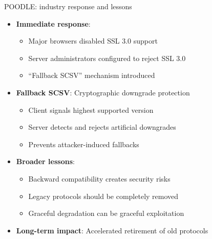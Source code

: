 \ifdefined\PRESENTATION\else\PassOptionsToClass{handout}{beamer}\fi\documentclass[aspectratio=169, lualatex]{beamer}
\begin{document}
\begin{frame}{POODLE: industry response and lessons}
	\begin{itemize}
		\item \textbf{Immediate response}:
		      \begin{itemize}
			      \item Major browsers disabled SSL 3.0 support
			      \item Server administrators configured to reject SSL 3.0
			      \item ``Fallback SCSV'' mechanism introduced
		      \end{itemize}
		\item \textbf{Fallback SCSV}: Cryptographic downgrade protection
		      \begin{itemize}
			      \item Client signals highest supported version
			      \item Server detects and rejects artificial downgrades
			      \item Prevents attacker-induced fallbacks
		      \end{itemize}
		\item \textbf{Broader lessons}:
		      \begin{itemize}
			      \item Backward compatibility creates security risks
			      \item Legacy protocols should be completely removed
			      \item Graceful degradation can be graceful exploitation
		      \end{itemize}
		\item \textbf{Long-term impact}: Accelerated retirement of old protocols
	\end{itemize}
\end{frame}
\end{document}
